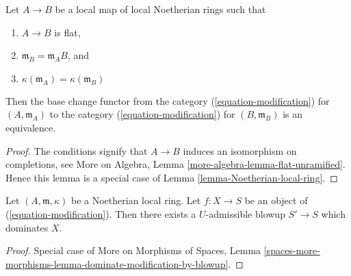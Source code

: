 \begin{lemma}
\label{lemma-equivalence-to-completion}
Let $A \to B$ be a local map of local Noetherian rings such that
\begin{enumerate}
\item $A \to B$ is flat,
\item $\mathfrak m_B = \mathfrak m_A B$, and
\item $\kappa(\mathfrak m_A) = \kappa(\mathfrak m_B)$
\end{enumerate}
Then the base change functor from the category
(\ref{equation-modification}) for $(A, \mathfrak m_A)$ to the category
(\ref{equation-modification}) for $(B, \mathfrak m_B)$
is an equivalence.
\end{lemma}

\begin{proof}
The conditions signify that $A \to B$ induces an isomorphism on
completions, see
More on Algebra, Lemma \ref{more-algebra-lemma-flat-unramified}.
Hence this lemma is a special case of
Lemma \ref{lemma-Noetherian-local-ring}.
\end{proof}

\begin{lemma}
\label{lemma-dominate-by-admissible-blowup}
Let $(A, \mathfrak m, \kappa)$ be a Noetherian local ring.
Let $f : X \to S$ be an object of (\ref{equation-modification}).
Then there exists a $U$-admissible blowup $S' \to S$
which dominates $X$.
\end{lemma}

\begin{proof}
Special case of More on Morphisms of Spaces,
Lemma \ref{spaces-more-morphisms-lemma-dominate-modification-by-blowup}.
\end{proof}











